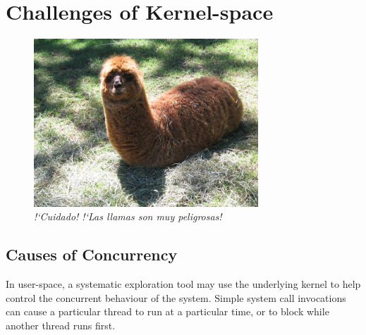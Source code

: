 \chapter{Challenges of Kernel-space}

\begin{figure}[h]
	\begin{center}
	\includegraphics[width=0.75\textwidth]{vip1066720.jpg}
	\end{center}
	\caption{{\em !`Cuidado! !`Las llamas son muy peligrosas!}\cite{de0u}}
\end{figure}

\section{Causes of Concurrency}

In user-space, a systematic exploration tool may use the underlying kernel to help control the concurrent behaviour of the system\cite{dbug-ssv}. Simple system call invocations can cause a particular thread to run at a particular time, or to block while another thread runs first.

